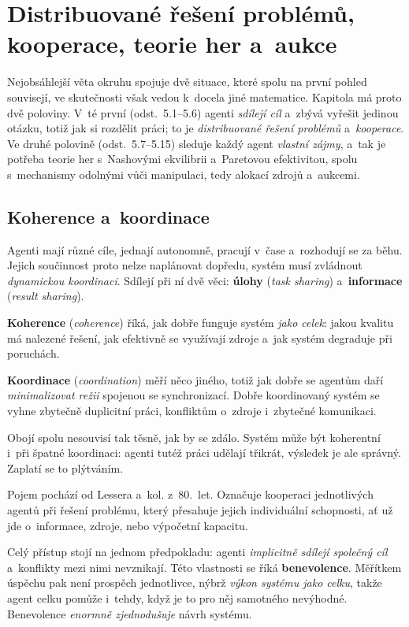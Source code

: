 \documentclass[11pt,a4paper]{article}
\theoremstyle{definition}
\begin{document}

\section{Distribuované řešení problémů, kooperace, teorie her a~aukce}
\label{sec:kooperace}

Nejobsáhlejší věta okruhu spojuje dvě situace, které spolu na první pohled souvisejí, ve
skutečnosti však vedou k~docela jiné matematice. Kapitola má proto dvě poloviny. V~té první
(odst.\ 5.1--5.6) agenti \emph{sdílejí cíl} a~zbývá vyřešit jedinou otázku, totiž jak si
rozdělit práci; to je \emph{distribuované řešení problémů} a~\emph{kooperace}. Ve druhé
polovině (odst.\ 5.7--5.15) sleduje každý agent \emph{vlastní zájmy}, a~tak je potřeba teorie
her s~Nashovými ekvilibrii a~Paretovou efektivitou, spolu s~mechanismy odolnými vůči
manipulaci, tedy alokací zdrojů a~aukcemi.
\subsection{Koherence a~koordinace}

Agenti mají různé cíle, jednají autonomně, pracují v~čase a~rozhodují se za běhu. Jejich
součinnost proto nelze naplánovat dopředu, systém musí zvládnout \emph{dynamickou koordinaci}.
Sdílejí při ní dvě věci: \textbf{úlohy} (\emph{task sharing}) a~\textbf{informace}
(\emph{result sharing}).

\begin{defbox}
\textbf{Koherence} (\emph{coherence}) říká, jak dobře funguje systém \emph{jako celek}: jakou
kvalitu má nalezené řešení, jak efektivně se využívají zdroje a~jak systém degraduje při
poruchách.

\textbf{Koordinace} (\emph{coordination}) měří něco jiného, totiž jak dobře se agentům daří
\emph{minimalizovat režii} spojenou se synchronizací. Dobře koordinovaný systém se vyhne
zbytečně duplicitní práci, konfliktům o~zdroje i~zbytečné komunikaci.

Obojí spolu nesouvisí tak těsně, jak by se zdálo. Systém může být koherentní i~při špatné
koordinaci: agenti tutéž práci udělají třikrát, výsledek je ale správný. Zaplatí se to
plýtváním.
\end{defbox}

\begin{defbox}
Pojem pochází od Lessera a~kol. z~80.~let. Označuje kooperaci jednotlivých agentů při řešení
problému, který přesahuje jejich individuální schopnosti, ať už jde o~informace, zdroje, nebo
výpočetní kapacitu.

Celý přístup stojí na jednom předpokladu: agenti \emph{implicitně sdílejí společný cíl}
a~konflikty mezi nimi nevznikají. Této vlastnosti se říká \textbf{benevolence}. Měřítkem
úspěchu pak není prospěch jednotlivce, nýbrž \emph{výkon systému jako celku}, takže agent celku
pomůže i~tehdy, když je to pro něj samotného nevýhodné. Benevolence \emph{enormně zjednodušuje}
návrh systému.
\end{defbox}
\end{document}
